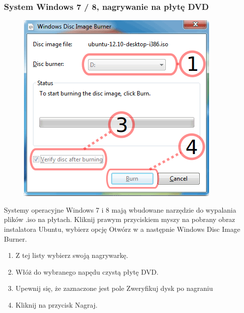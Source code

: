 \subsubsection{System Windows 7 / 8, nagrywanie na płytę DVD}
\begin{figure}
	\vspace{-10pt}
	\includegraphics[width=\linewidth]{images/instalacja_nagrywanie_obrazu_DVD.png}
\end{figure}

Systemy operacyjne Windows 7 i 8 mają wbudowane narzędzie do wypalania plików .iso na płytach. Kliknij prawym przyciskiem myszy na pobrany obraz instalatora Ubuntu, wybierz opcję \textcolor{ubuntu_orange}{Otwórz w} a następnie \textcolor{ubuntu_orange}{Windows Disc Image Burner}.
\begin{enumerate}[label=\protect\circled{\arabic*}]
\item Z tej listy wybierz swoją nagrywarkę.
\item Włóż do wybranego napędu czystą płytę DVD.
\item Upewnij się, że zaznaczone jest pole \textcolor{ubuntu_orange}{Zweryfikuj dysk po nagraniu}
\item Kliknij na przycisk \textcolor{ubuntu_orange}{Nagraj}.
\end{enumerate}

